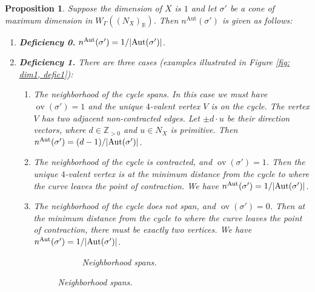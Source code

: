 \documentclass{article}
\def\Z{\mathbb{Z}}
\def\Aut{{\rm Aut}}
\newtheorem{proposition}[definition]{Proposition}
\newcommand{\ov}[1]{\operatorname{ov}(#1)}
\newcommand{\nn}{n^{\operatorname{Aut}}}
\begin{document}
\begin{proposition}\label{thm:mult1} 
    Suppose the dimension of $X$ is $1$ and let $\sigma'$ be a cone of maximum dimension in $W_{\Gamma}((N_X)_{\mathbb{R}})$. Then $\nn(\sigma')$ is given as follows:
    \begin{enumerate}
        \item \textbf{Deficiency 0.} $\nn(\sigma') = 1/|\Aut(\sigma')|$. 
        \item  \textbf{Deficiency 1.} There are three cases (examples illustrated in Figure \ref{fig: dim1, defic1}):
        
        \begin{enumerate}
    \item The neighborhood of the cycle spans. In this case we must have $\ov{\sigma'} = 1$ and the unique $4$-valent vertex $V$ is on the cycle. The vertex $V$ has two adjacent non-contracted edges. Let $\pm d \cdot u$ be their direction vectors, where $ d \in \Z_{>0}$ and $u \in N_X$ is primitive. 
    Then $\nn(\sigma') = (d-1)/|\Aut(\sigma')|$. 
    \item The neighborhood of the cycle is contracted, and $\ov{\sigma'} = 1$. Then the unique $4$-valent vertex is at the minimum distance from the cycle to where the curve leaves the point of contraction. We have $\nn(\sigma') = 1/|\Aut(\sigma')|$. 
    \item The neighborhood of the cycle does not span, and $\ov{\sigma'} = 0$. Then at the minimum distance from the cycle to where the curve leaves the point of contraction, there must be exactly two vertices. We have $\nn(\sigma') = 1/|\Aut(\sigma')|$. 
    \begin{figure}[h]
    \centering
    \begin{subfigure}[t]{0.3\textwidth}
        \centering
        \caption{Neighborhood spans.}
        \label{fig:dim1nbhdspan}
    \end{subfigure}

\end{figure}
\end{enumerate}
\end{enumerate}
\end{proposition}
\end{document}
